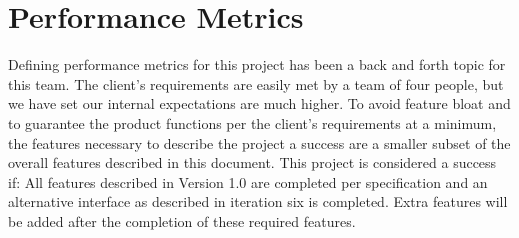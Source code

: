 \documentclass[onecolumn, draftclsnofoot,10pt, compsoc]{IEEEtran}
\begin{document}
		\section{Performance Metrics}
		Defining performance metrics for this project has been a back and forth topic for this team. The client's requirements are easily met by a team of four people, but we have set our internal expectations are much higher. To avoid feature bloat and to guarantee the product functions per the client's requirements at a minimum, the features necessary to describe the project a success are a smaller subset of the overall features described in this document. This project is considered a success if: All features described in Version 1.0 are completed per specification and an alternative interface as described in iteration six is completed. Extra features will be added after the completion of these required
		features.
\end{document}
